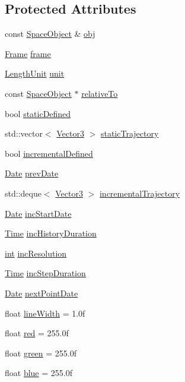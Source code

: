 \subsection*{Protected Attributes}
\begin{DoxyCompactItemize}
\item 
const \hyperlink{class_space_object}{Space\+Object} \& \hyperlink{class_trajectory_a7e553e1118e6a4accfacb8fae0d24f2b}{obj}
\item 
\hyperlink{class_frame}{Frame} \hyperlink{class_trajectory_a37e42637b529f9939b499600a07d2660}{frame}
\item 
\hyperlink{_quantity_8h_afb62d6d68e6cd2c62c96aa8c3aeb7d1f}{Length\+Unit} \hyperlink{class_trajectory_a8d881aa7724623b0a675a7f3cbe118bc}{unit}
\item 
const \hyperlink{class_space_object}{Space\+Object} $\ast$ \hyperlink{class_trajectory_aa0634363940b3bfa6c069a58b89fe975}{relative\+To}
\item 
bool \hyperlink{class_trajectory_a28f0f31968990bc14ef64093f863f15e}{static\+Defined}
\item 
std\+::vector$<$ \hyperlink{class_vector3}{Vector3} $>$ \hyperlink{class_trajectory_a8a7ff5214ca817280dea38c3f5c62cbf}{static\+Trajectory}
\item 
bool \hyperlink{class_trajectory_ac51564d2490c6d02fce1b28d67afe8e6}{incremental\+Defined}
\item 
\hyperlink{class_date}{Date} \hyperlink{class_trajectory_a6d2fbd4cfaec29cfdf4f801318a88f3d}{prev\+Date}
\item 
std\+::deque$<$ \hyperlink{class_vector3}{Vector3} $>$ \hyperlink{class_trajectory_a78edc3b797f73f84656279d08cb2bd37}{incremental\+Trajectory}
\item 
\hyperlink{class_date}{Date} \hyperlink{class_trajectory_a37ed928f5e147cf76d702f0aae0f0bee}{inc\+Start\+Date}
\item 
\hyperlink{_quantity_8h_ab180382d5dc1bcb91259cbd59a5d86fc}{Time} \hyperlink{class_trajectory_a7330cbb6db806aefd41b22fcedb00e83}{inc\+History\+Duration}
\item 
\hyperlink{wglext_8h_a500a82aecba06f4550f6849b8099ca21}{int} \hyperlink{class_trajectory_a8894f4a18e771016f5e76d52209e6eee}{inc\+Resolution}
\item 
\hyperlink{_quantity_8h_ab180382d5dc1bcb91259cbd59a5d86fc}{Time} \hyperlink{class_trajectory_a49cef2583b8b87c9d9afe963d381426d}{inc\+Step\+Duration}
\item 
\hyperlink{class_date}{Date} \hyperlink{class_trajectory_ab04d69563f531cfbdf3f61f107592d44}{next\+Point\+Date}
\item 
float \hyperlink{class_trajectory_a7cf337f408aa8f27d93c68d40d5030ce}{line\+Width} = 1.\+0f
\item 
float \hyperlink{class_trajectory_a3000185975d15a117e751eb9908593fe}{red} = 255.\+0f
\item 
float \hyperlink{class_trajectory_a26301a3b5552b8dabc1b620a426fbcf0}{green} = 255.\+0f
\item 
float \hyperlink{class_trajectory_aab23c0150b87a4df1564c403ecd17507}{blue} = 255.\+0f
\end{DoxyCompactItemize}


